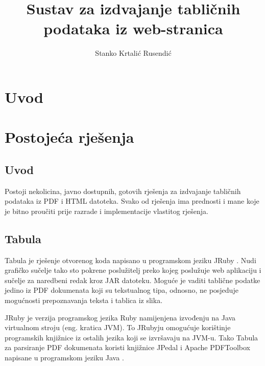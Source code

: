 \documentclass[times, utf8, zavrsni]{fer}
\begin{document}

\title{Sustav za izdvajanje tabličnih podataka iz web-stranica}

\author{Stanko Krtalić Rusendić}

\maketitle


\tableofcontents

\chapter{Uvod}



\chapter{Postojeća rješenja}

\section{Uvod}

Postoji nekolicina, javno dostupnih, gotovih rješenja za izdvajanje tabličnih
podataka iz PDF \cite{pdf_documentation}
i HTML \cite{html_documentation}
datoteka. Svako od rješenja ima prednosti i mane koje je
bitno proučiti prije razrade i implementacije vlastitog rješenja.

\section{Tabula}

Tabula \cite{tabula_repository} je rješenje otvorenog koda napisano u
programskom jeziku JRuby \cite{jruby_documentation}.
Nudi grafičko sučelje tako sto pokrene poslužitelj preko kojeg poslužuje web
aplikaciju i sučelje za naredbeni redak kroz
JAR \cite{java_language_specification} datoteku. Moguće je vaditi
tablične podatke jedino iz PDF dokumenata koji su tekstualnog tipa, odnosno,
ne posjeduje mogućnosti prepoznavanja teksta i tablica iz slika.

JRuby je verzija programskog jezika Ruby namijenjena izvođenju na Java
virtualnom stroju \cite{java_virtual_machine_specification} (eng. kratica JVM).
To JRubyju omogućuje korištinje
programskih knjižnice iz ostalih jezika koji se izvršavaju na JVM-u. Tako
Tabula za parsiranje PDF dokumenata koristi knjižnice JPedal i Apache
PDFToolbox \cite{apache_pdftoolbox_specification} napisane u programskom
jeziku Java \cite{java_language_specification}.
\end{document}
